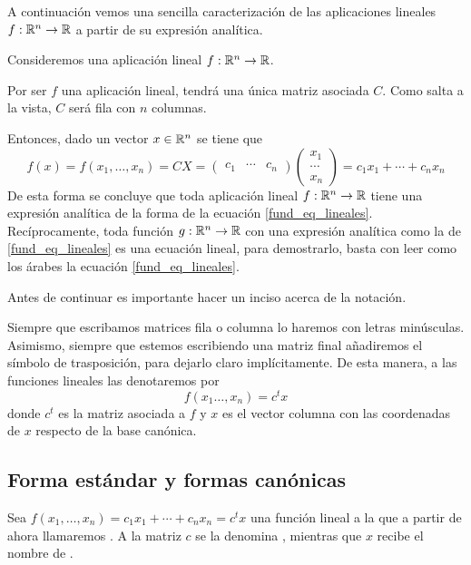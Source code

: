 A continuación vemos una sencilla caracterización de las aplicaciones lineales $f:\mathbb{R}^n\to\mathbb{R}$ a partir de su expresión analítica.
\begin{obs}
	Consideremos una aplicación lineal $f:\mathbb{R}^n\to\mathbb{R}$.
	
	Por ser $f$ una aplicación lineal, tendrá una única matriz asociada $C$. Como salta a la vista, $C$ será fila con $n$ columnas.
	
	Entonces, dado un vector $x\in\mathbb{R}^n$ se tiene que
	\begin{equation}
	\label{fund_eq_lineales}
	f(x)=f(x_1,\dots,x_n)= CX=\begin{pmatrix}
	c_1 & \cdots & c_n
	\end{pmatrix}\begin{pmatrix}
	x_1\\ \cdots \\x_n
	\end{pmatrix}=c_1x_1+\cdots+c_nx_n
	\end{equation}
	De esta forma se concluye que toda aplicación lineal $f:\mathbb{R}^n\to\mathbb{R}$ tiene una expresión analítica de la forma de la ecuación \eqref{fund_eq_lineales}. Recíprocamente, toda función $g:\mathbb{R}^n\to\mathbb{R}$ con una expresión analítica como la de \eqref{fund_eq_lineales} es una ecuación lineal, para demostrarlo, basta con leer como los árabes la ecuación \eqref{fund_eq_lineales}.
\end{obs}
Antes de continuar es importante hacer un inciso acerca de la notación.
\begin{obs}
	Siempre que escribamos matrices fila o columna lo haremos con letras minúsculas. Asimismo, siempre que estemos escribiendo una matriz final añadiremos el símbolo de trasposición, para dejarlo claro implícitamente. De esta manera, a las funciones lineales las denotaremos por
	\begin{equation*}
		f(x_1\dots,x_n)=c^tx
	\end{equation*}
	donde $c^t$ es la matriz asociada a $f$ y $x$ es el vector columna con las coordenadas de $x$ respecto de la base canónica.
\end{obs}
\subsection{Forma estándar y formas canónicas}

Sea $f(x_1,\dots,x_n)=c_1x_1+\cdots+c_nx_n=c^tx$ una función lineal  a la que a partir de ahora llamaremos . A la matriz $c$ se la denomina , mientras que $x$ recibe el nombre de .

